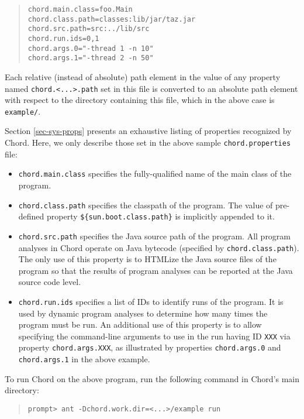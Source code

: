 \documentclass{article}
\providecommand\Chord{Chord}
\begin{document}
\begin{quote}
\begin{verbatim}
chord.main.class=foo.Main
chord.class.path=classes:lib/jar/taz.jar
chord.src.path=src:../lib/src
chord.run.ids=0,1
chord.args.0="-thread 1 -n 10"
chord.args.1="-thread 2 -n 50"
\end{verbatim}
\end{quote}

Each relative (instead of absolute) path element in the value of any property
named \verb+chord.<...>.path+ set in this file is converted to an absolute path element with respect
to the directory containing this file, which in the above case is \verb+example/+.

Section \ref{sec-sys-props} presents an exhaustive
listing of properties recognized by \Chord.
Here, we only describe those set in the above
sample \verb+chord.properties+ file:

\begin{itemize}
\item
\verb+chord.main.class+ specifies the fully-qualified name of the main class of the
program.
\item
\verb+chord.class.path+ specifies the classpath of the program.
The value of pre-defined property \verb+${sun.boot.class.path}+ is implicitly appended
to it.
\item
\verb+chord.src.path+ specifies the Java source path of the program.
All program analyses in Chord operate on Java bytecode (specified by \verb+chord.class.path+).
The only use of this property is to HTMLize the Java source files of the program so that the
results of program analyses can be reported at the Java source code level.
\item
\verb+chord.run.ids+ specifies a list of IDs to identify runs of the program.
It is used by dynamic program analyses to determine how many times the program must be run.
An additional use of this property is to allow specifying the command-line arguments to use
in the run having ID \verb+XXX+ via property \verb+chord.args.XXX+, as illustrated by
properties \verb+chord.args.0+ and \verb+chord.args.1+ in the above example.
\end{itemize}

To run Chord on the above program, run the following command in Chord's main directory:

\begin{quote}
\begin{verbatim}
prompt> ant -Dchord.work.dir=<...>/example run
\end{verbatim}
\end{quote}
\end{document}
